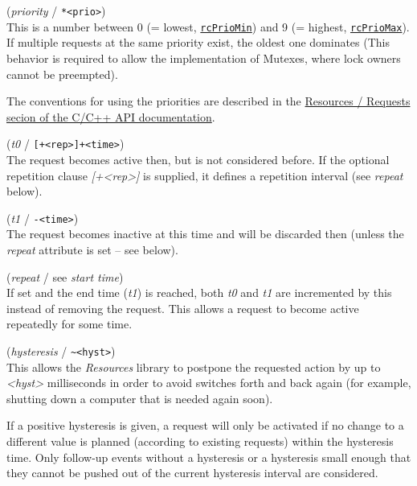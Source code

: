 \documentclass[12pt,english,parskip=half,headheight=19pt]{scrreprt}
\renewenvironment{description}[1][8ex]
  {\list{}{\labelwidth=5ex \leftmargin=#1 \let\makelabel\descriptionlabel}}
  {\endlist}
\newcommand{\refapic}[1]{\href{home2l-api_c/index.html}{\mbox{\texttt{#1}}}}            %
\newcommand{\refapicgroup}[2]{\href{home2l-api_c/group__#1.html}{#2}}
\begin{document}
\begin{description}

\item[\textit{Priority}] (\textit{priority} / \texttt{*<prio>}) \\
  This is a number between 0 (= lowest, \refapic{rcPrioMin}) and 9 (= highest, \refapic{rcPrioMax}).
  If multiple requests at the same priority exist, the oldest one dominates
  (This behavior is required to allow the implementation of Mutexes, where lock owners cannot be preempted).

  The conventions for using the priorities are described in the
  \refapicgroup{resources__requests}{Resources / Requests secion of the C/C++ API documentation}.

\item[\textit{Start time} (or \textit{on time})] (\textit{t0} / \texttt{[+<rep>]+<time>}) \\
  The request becomes active then, but is not considered before.
  If the optional repetition clause \textit{[+<rep>]} is supplied, it defines a repetition interval
  (see \textit{repeat} below).

\item[\textit{End time} (or \textit{off time})] (\textit{t1} / \texttt{-<time>}) \\
  The request becomes inactive at this time and will be discarded then
  (unless the \textit{repeat} attribute is set -- see below).

\item[\textit{Repetition interval}] (\textit{repeat} / see \textit{start time}) \\
  If set and the end time (\textit{t1}) is reached, both \textit{t0} and \textit{t1} are incremented by
  this instead of removing the request. This allows a request to become active repeatedly for some time.

\item[\textit{Hysteresis}] (\textit{hysteresis} / \texttt{\~{}<hyst>}) \\
  This allows the \textit{Resources} library to postpone the requested action by up to
  \textit{<hyst>} milliseconds in order to avoid switches forth and
  back again (for example, shutting down a computer that is needed again soon).

  If a positive hysteresis is given, a request will only be activated if
  no change to a different value is planned (according to existing
  requests) within the hysteresis time. Only follow-up events without a
  hysteresis or a hysteresis small enough that they cannot be pushed out
  of the current hysteresis interval are considered.

\end{description}
\end{document}

